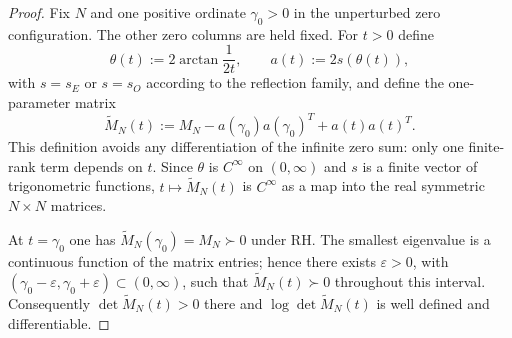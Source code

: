 \documentclass[11pt]{amsart}
\numberwithin{equation}{section}
\theoremstyle{plain}
\theoremstyle{definition}
\theoremstyle{remark}
\newcommand{\RH}{\mathrm{RH}}
\begin{document}
\begin{proof}
Fix $N$ and one positive ordinate $\gamma_0>0$ in the unperturbed zero configuration.  The other zero columns are held fixed.  For $t>0$ define
\begin{equation}
\theta(t):=2\arctan\frac{1}{2t},
\qquad
a(t):=2s(\theta(t)),
\end{equation}
with $s=s_E$ or $s=s_O$ according to the reflection family, and define the one-parameter matrix
\begin{equation}
\widetilde M_N(t):=M_N-a(\gamma_0)a(\gamma_0)^T+a(t)a(t)^T.
\label{eq:local_moving_zero_matrix}
\end{equation}
This definition avoids any differentiation of the infinite zero sum: only one finite-rank term depends on $t$.  Since $\theta$ is $C^\infty$ on $(0,\infty)$ and $s$ is a finite vector of trigonometric functions, $t\mapsto\widetilde M_N(t)$ is $C^\infty$ as a map into the real symmetric $N\times N$ matrices.

At $t=\gamma_0$ one has $\widetilde M_N(\gamma_0)=M_N\succ0$ under $\RH$.  The smallest eigenvalue is a continuous function of the matrix entries; hence there exists $\varepsilon>0$, with $(\gamma_0-\varepsilon,\gamma_0+\varepsilon)\subset(0,\infty)$, such that $\widetilde M_N(t)\succ0$ throughout this interval.  Consequently $\det\widetilde M_N(t)>0$ there and $\log\det\widetilde M_N(t)$ is well defined and differentiable.


\end{proof}
\end{document}
